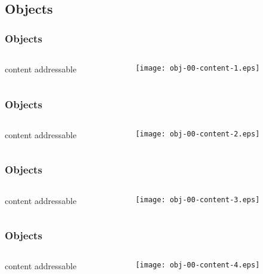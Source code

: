 \documentclass[english]{beamer}
\newcommand{\mysubsection}[2]{
  \hypertarget{#2}{}
  \subsection{#1}
  \label{#2}
}
\begin{document}
\mysubsection{Objects}{using:objects}
\begin{frame}
\frametitle{Objects}
\begin{columns}[t]
        \begin{column}[T]{.5\textwidth}
                content addressable
        \end{column}
        \begin{column}[T]{.5\textwidth}
                \texttt{[image: obj-00-content-1.eps]}
        \end{column}
\end{columns}
\end{frame}

\begin{frame}
\frametitle{Objects}
\begin{columns}[t]
        \begin{column}[T]{.5\textwidth}
                content addressable
        \end{column}
        \begin{column}[T]{.5\textwidth}
                \texttt{[image: obj-00-content-2.eps]}
        \end{column}
\end{columns}
\end{frame}

\begin{frame}
\frametitle{Objects}
\begin{columns}[t]
        \begin{column}[T]{.5\textwidth}
                content addressable
        \end{column}
        \begin{column}[T]{.5\textwidth}
                \texttt{[image: obj-00-content-3.eps]}
        \end{column}
\end{columns}
\end{frame}

\begin{frame}
\frametitle{Objects}
\begin{columns}[t]
        \begin{column}[T]{.5\textwidth}
                content addressable
        \end{column}
        \begin{column}[T]{.5\textwidth}
                \texttt{[image: obj-00-content-4.eps]}
        \end{column}
\end{columns}
\end{frame}
\end{document}
